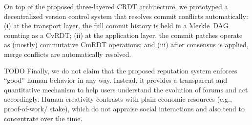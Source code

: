 \documentclass[10pt,journal,compsoc]{IEEEtran}
\newcommand{\reps}     {\emph{reps}\xspace}
\begin{document}
On top of the proposed three-layered CRDT architecture, we prototyped a
decentralized version control system that resolves commit conflicts
automatically:
    (i)   at the transport layer, the full commit history is held in a
          Merkle~DAG counting as a CvRDT;
    (ii)  at the application layer, the commit patches operate as (mostly)
          commutative CmRDT operations; and
    (iii) after consensus is applied, merge conflicts are automatically
          resolved.

TODO
Finally, we do not claim that the proposed reputation system enforces ``good''
human behavior in any way.
Instead, it provides a transparent and quantitative mechanism to help users
understand the evolution of forums and act accordingly.
Human creativity contrasts with plain economic resources (e.g., proof-of-work/
stake), which do not appraise social interactions and also tend to concentrate
over the time.
%

\end{document}

